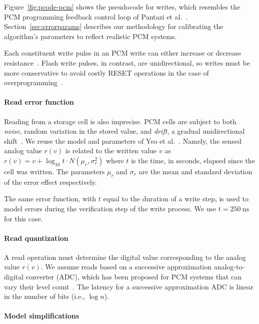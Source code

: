 \documentclass[prodmode,acmtocs]{acmsmall}
\begin{document}
Figure~\ref{fig:pcode-pcm} shows the pseudocode for
writes, which resembles the PCM programming feedback
control loop of Pantazi et al.~\cite{mlcmodelchar}.
Section~\ref{sec:errorparams} describes our methodology for
calibrating the algorithm's parameters to reflect realistic PCM
systems.

Each constituent write pulse in an PCM write can either increase or decrease
resistance~\cite{mlcprogalgo,mlcibm,mlcmodelchar}.
Flash write pulses, in contrast, are unidirectional, so writes
must be more conservative to avoid costly RESET operations
in the case of overprogramming~\cite{ispp}.

\paragraph{Read error function}

Reading from a storage cell is also imprecise. PCM
cells are subject to both \emph{noise}, random variation in the stored value,
and \emph{drift}, a gradual unidirectional
shift~\cite{mlcpcmreliability}. We reuse the model and parameters of
Yeo et al.~\cite{wdddmlcpcm}. Namely, the sensed
analog value $r(v)$ is related to the written value $v$ as
$r(v) = v + \log_{10} t \cdot N(\mu_r, \sigma_r^2)$
where $t$ is the time, in seconds, elapsed since the cell was written.
The parameters $\mu_r$ and $\sigma_r$ are the mean and standard
deviation of the error effect respectively.

The same error function, with $t$ equal to the duration of a write step,
is used to model errors during the verification step of the write
process. We use $t = 250~\mathrm{ns}$~\cite{writecancel,improvingwrites} for
this case.

\paragraph{Read quantization}

A read operation must determine the digital value corresponding to the
analog value $r(v)$. We assume reads based on a successive
approximation analog-to-digital converter (ADC), which has been proposed for PCM
systems that can vary their level count~\cite{morphablepcm}. The
latency for a successive approximation ADC is linear in the number of
bits (i.e., $\log n$).

\paragraph{Model simplifications}
\end{document}
